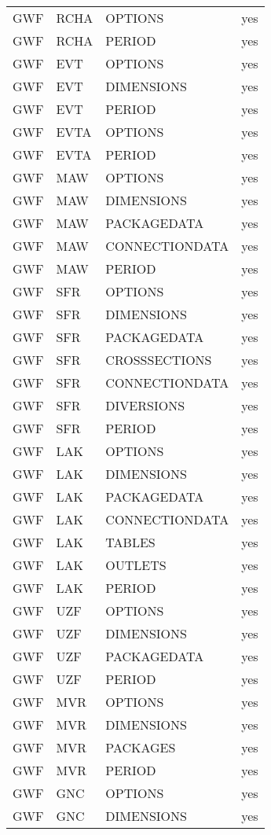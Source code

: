 \begin{longtable}{p{1.5cm} p{1.5cm} p{3cm} c}
\hline
GWF & RCHA & OPTIONS & yes \\ 
GWF & RCHA & PERIOD & yes \\ 
\hline
GWF & EVT & OPTIONS & yes \\ 
GWF & EVT & DIMENSIONS & yes \\ 
GWF & EVT & PERIOD & yes \\ 
\hline
GWF & EVTA & OPTIONS & yes \\ 
GWF & EVTA & PERIOD & yes \\ 
\hline
GWF & MAW & OPTIONS & yes \\ 
GWF & MAW & DIMENSIONS & yes \\ 
GWF & MAW & PACKAGEDATA & yes \\ 
GWF & MAW & CONNECTIONDATA & yes \\ 
GWF & MAW & PERIOD & yes \\ 
\hline
GWF & SFR & OPTIONS & yes \\ 
GWF & SFR & DIMENSIONS & yes \\ 
GWF & SFR & PACKAGEDATA & yes \\ 
GWF & SFR & CROSSSECTIONS & yes \\ 
GWF & SFR & CONNECTIONDATA & yes \\ 
GWF & SFR & DIVERSIONS & yes \\ 
GWF & SFR & PERIOD & yes \\ 
\hline
GWF & LAK & OPTIONS & yes \\ 
GWF & LAK & DIMENSIONS & yes \\ 
GWF & LAK & PACKAGEDATA & yes \\ 
GWF & LAK & CONNECTIONDATA & yes \\ 
GWF & LAK & TABLES & yes \\ 
GWF & LAK & OUTLETS & yes \\ 
GWF & LAK & PERIOD & yes \\ 
\hline
GWF & UZF & OPTIONS & yes \\ 
GWF & UZF & DIMENSIONS & yes \\ 
GWF & UZF & PACKAGEDATA & yes \\ 
GWF & UZF & PERIOD & yes \\ 
\hline
GWF & MVR & OPTIONS & yes \\ 
GWF & MVR & DIMENSIONS & yes \\ 
GWF & MVR & PACKAGES & yes \\ 
GWF & MVR & PERIOD & yes \\ 
\hline
GWF & GNC & OPTIONS & yes \\ 
GWF & GNC & DIMENSIONS & yes \\ 

\end{longtable}
